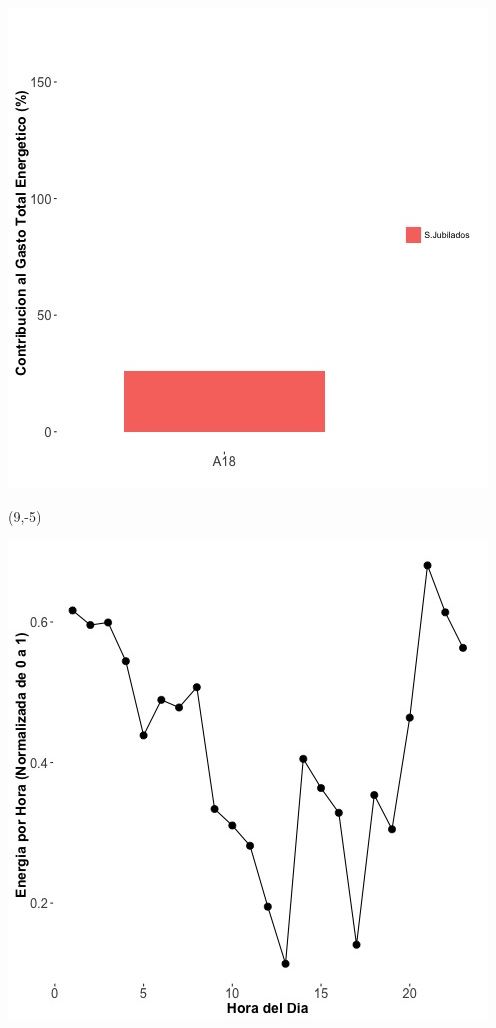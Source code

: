 \documentclass{article}\usepackage[]{graphicx}\usepackage[]{color}
\newenvironment{knitrout}{}{} %
\begin{document}
\begin{knitrout}
\color{fgcolor}
\includegraphics[scale=0.65]{figure/A18_subvars_plot.jpg} 
\end{knitrout}

 \begin{textblock}{1}(9,-5)
\begin{minipage}{20em}
\begingroup

\endgroup
\end{minipage}
\end{textblock}

\begin{knitrout}
\color{fgcolor}
\includegraphics[scale=0.65]{figure/A18_plot_norm_median} 
\end{knitrout}
\end{document}
